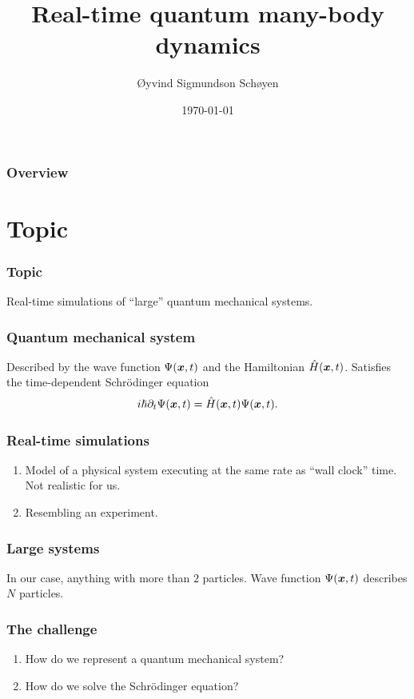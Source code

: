 \documentclass{beamer}
\author{Øyvind Sigmundson Schøyen}
\title{Real-time quantum many-body dynamics}
\institute{University of Oslo}
\date{\today}
\begin{document}
\begin{frame}
    \titlepage
\end{frame}
\begin{frame}
    \frametitle{Overview}
    \tableofcontents
\end{frame}

\section{Topic}

\begin{frame}
    \frametitle{Topic}
    Real-time simulations of ``large'' quantum mechanical systems.
\end{frame}

\begin{frame}
    \frametitle{Quantum mechanical system}
    Described by the wave function $\Psi(\boldsymbol{x}, t)$ and the Hamiltonian
    $\hat{H}(\boldsymbol{x}, t)$.
    Satisfies the time-dependent Schrödinger equation
    \begin{align}
        i\hslash \partial_t\Psi(\boldsymbol{x}, t)
        = \hat{H}(\boldsymbol{x}, t)\Psi(\boldsymbol{x}, t).
    \end{align}
\end{frame}

\begin{frame}
    \frametitle{Real-time simulations}
    \begin{enumerate}
        \item Model of a physical system executing at the same rate as ``wall
            clock'' time.
            Not realistic for us.
        \item Resembling an experiment.
    \end{enumerate}
\end{frame}

\begin{frame}
    \frametitle{Large systems}
    In our case, anything with more than $2$ particles.
    Wave function $\Psi(\boldsymbol{x}, t)$ describes $N$ particles.
\end{frame}

\begin{frame}
    \frametitle{The challenge}
    \begin{enumerate}
        \item How do we represent a quantum mechanical system?
        \item How do we solve the Schrödinger equation?
    \end{enumerate}
\end{frame}
\end{document}
